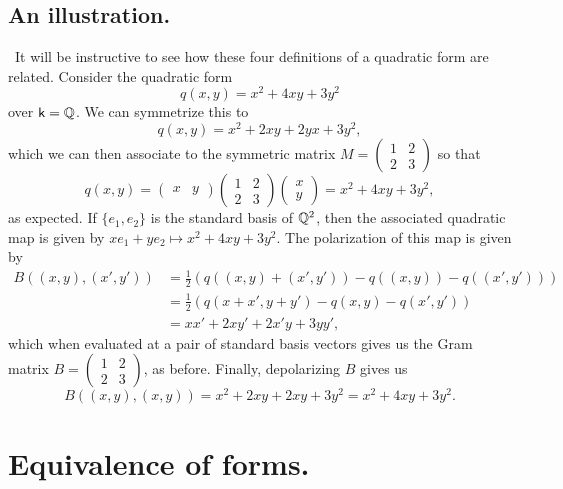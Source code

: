 \subsection{An illustration.}~It will be instructive to see how these four
definitions of a quadratic form are related. Consider the quadratic form \[q(x,
y) = x^2 + 4xy + 3y^2\] over \(\mathsf{k} = \mathbb{Q}\). We can symmetrize this to
\[q(x, y) = x^2 + 2xy + 2yx + 3y^2,\] which we can then associate to the
symmetric matrix \(M = \begin{pmatrix} 1 & 2 \\ 2 & 3 \end{pmatrix}\) so that
\[
  q(x, y) = \begin{pmatrix}
    x & y
  \end{pmatrix} \begin{pmatrix}
    1 & 2 \\
    2 & 3
  \end{pmatrix} \begin{pmatrix}
    x \\ y
  \end{pmatrix}= x^2 + 4xy + 3y^2,
\]
as expected. If \(\{e_1, e_2\}\) is the standard basis of \(\mathbb{Q}^2\), then
the associated quadratic map is given by \(xe_1 + ye_2 \mapsto x^2 + 4xy +
3y^2\). The polarization of this map is given by
\begin{align*}
  B((x,y), (x', y')) &= \frac{1}{2}\left(q((x,y) + (x', y')) - q((x,y)) - q((x', y'))\right)\\
  &= \frac{1}{2}\left(q(x+x', y+y') - q(x, y) - q(x', y')\right)\\
  &= xx' + 2xy' + 2x'y + 3yy',
\end{align*}
which when evaluated at a pair of standard basis vectors gives us the Gram
matrix \(B = \begin{pmatrix} 1 & 2 \\ 2 & 3 \end{pmatrix}\), as before. Finally,
depolarizing \(B\) gives us
\[
  B((x, y), (x, y)) = x^2 + 2xy + 2xy + 3y^2 = x^2 + 4xy + 3y^2.
\]

\section{Equivalence of forms.}

